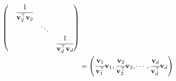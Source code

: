 \documentclass[11pt,letter,notitlepage]{article}
\begin{document}
\begin{solution}
\begin{enumerate}
\begin{enumerate}
\begin{enumerate}
$$\begin{aligned}
\begin{pmatrix}
							                                                           & \cfrac{1}{\mathbf{v}_2^\top\mathbf{v}_2 }                                                     \\
							                                                           &                                           & \ddots                                            \\
							                                                           &                                           &        & \cfrac{1}{\mathbf{v}_d^\top\mathbf{v}_d}
						                  \end{pmatrix}                                           \\
						                   & =\left( \cfrac{\mathbf{v}_1}{\mathbf{v}_1^\top}\mathbf{v}_1,
						                  \cfrac{\mathbf{v}_2}{\mathbf{v}_2^\top}\mathbf{v}_2,
						                  \cdots,
						                  \cfrac{\mathbf{v}_d}{\mathbf{v}_d^\top}\mathbf{v}_d \right)
					                  \end{aligned}$$


\end{enumerate}
\end{enumerate}
\end{enumerate}
\end{solution}
\end{document}
